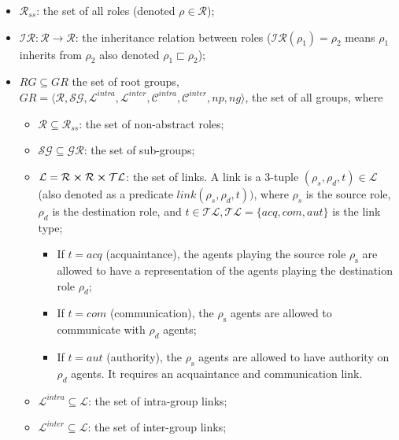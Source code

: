 \documentclass[pdflatex,sn-mathphys-num]{sn-jnl}%
\theoremstyle{thmstyleone}%
\theoremstyle{thmstyletwo}%
\theoremstyle{thmstylethree}%
\begin{document}
\begin{itemize}

    \item $\mathcal{R}_{ss}$: the set of all roles (denoted $\rho \in \mathcal{R}$);

    \item $\mathcal{IR}: \mathcal{R} \rightarrow \mathcal{R}$: the inheritance relation between roles ($\mathcal{IR}(\rho_1) = \rho_2$ means $\rho_1$ inherits from $\rho_2$ also denoted $\rho_1 \sqsubset \rho_2$);

    \item $RG \subseteq GR$ the set of root groups, $GR = \langle \mathcal{R}, \mathcal{SG}, \mathcal{L}^{intra}, \mathcal{L}^{inter}, \mathcal{C}^{intra}, \mathcal{C}^{inter}, np, ng \rangle$, the set of all groups, where

          \begin{itemize}

              \item $\mathcal{R} \subseteq \mathcal{R}_{ss}$: the set of non-abstract roles;

              \item $\mathcal{SG} \subseteq \mathcal{GR}$: the set of sub-groups;

              \item $\mathcal{L} = \mathcal{R} \cross \mathcal{R} \cross \mathcal{TL}$: the set of links. A link is a 3-tuple $(\rho_s,\rho_d,t) \in \mathcal{L}$ (also denoted as a predicate $link(\rho_s,\rho_d,t))$, where $\rho_{s}$ is the source role, $\rho_{d}$ is the destination role, and $t \in \mathcal{TL}, \mathcal{TL} = \{acq, com, aut\}$ is the link type;
                    \begin{itemize}
                        \item If $t = acq$ (acquaintance), the agents playing the source role $\rho_{\mathrm{s}}$ are allowed to have a representation of the agents playing the destination role $\rho_{d}$;
                        \item If $t = com$ (communication), the $\rho_{\mathrm{s}}$ agents are allowed to communicate with $\rho_{d}$ agents;
                        \item If $t = aut$ (authority), the $\rho_{\mathrm{s}}$ agents are allowed to have authority on $\rho_{d}$ agents. It requires an acquaintance and communication link.
                    \end{itemize}
              \item $\mathcal{L}^{intra} \subseteq \mathcal{L}$: the set of intra-group links;
              \item $\mathcal{L}^{inter} \subseteq \mathcal{L}$: the set of inter-group links;


\end{itemize}
\end{itemize}
\end{document}
